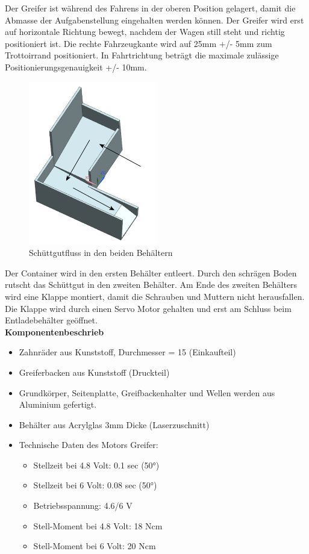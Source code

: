 Der Greifer ist während des Fahrens in der oberen Position gelagert, damit die Abmasse der Aufgabenstellung eingehalten werden können. Der Greifer wird erst auf horizontale Richtung bewegt, nachdem der Wagen still steht und richtig positioniert ist.
Die rechte Fahrzeugkante wird auf 25mm +/- 5mm zum Trottoirrand positioniert. In Fahrtrichtung beträgt die maximale zulässige Positionierungsgenauigkeit +/- 10mm.
%
\begin{figure}[H]
\centering
\includegraphics[width=0.5\textwidth]{03_Loesungskonzept/pictures/behaelter.png}
\caption{Schüttgutfluss in den beiden Behältern}
\end{figure}\flushleft
Der Container wird in den ersten Behälter entleert. Durch den schrägen Boden rutscht das Schüttgut in den zweiten Behälter. Am Ende des zweiten Behälters wird eine Klappe montiert, damit die Schrauben und Muttern nicht herausfallen. Die Klappe wird durch einen Servo Motor gehalten und erst am Schluss beim Entladebehälter geöffnet.\\[0.2cm]
%
\textbf{Komponentenbeschrieb}\\[0.2cm]
\begin{itemize}
\item Zahnräder aus Kunststoff, Durchmesser = 15 (Einkaufteil)
\item Greiferbacken aus Kunststoff (Druckteil)
\item Grundkörper, Seitenplatte, Greifbackenhalter und Wellen werden aus Aluminium gefertigt.
\item Behälter aus Acrylglas 3mm Dicke (Laserzuschnitt)
\item Technische Daten des Motors Greifer:
\begin{itemize}
\item Stellzeit bei 4.8 Volt: 0.1 sec (50°) 
\item Stellzeit bei 6 Volt: 0.08 sec (50°) 
\item Betriebsspannung: 4.6/6 V
\item Stell-Moment bei 4.8 Volt: 18 Ncm
\item Stell-Moment bei 6 Volt: 20 Ncm 
\end{itemize}
\end{itemize}
